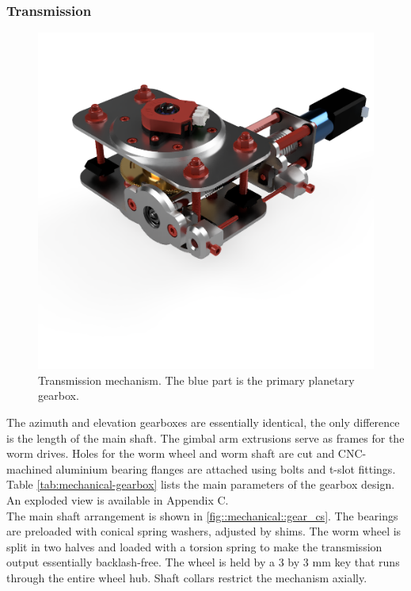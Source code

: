 \subsubsection{Transmission}
\begin{figure}[H]
	\centering 
	\includegraphics[scale=0.4]{4-experiment-design/img/mechanical/transmission.png}
	\caption{Transmission mechanism. The blue part is the primary planetary gearbox.}
	\label{fig::mechanical::transmission}
\end{figure}

The azimuth and elevation gearboxes are essentially identical, the only difference is the length of the main shaft. The gimbal arm extrusions serve as frames for the worm drives. Holes for the worm wheel and worm shaft are cut and CNC-machined aluminium bearing flanges are attached using bolts and t-slot fittings. Table \ref{tab:mechanical-gearbox} lists the main parameters of the gearbox design. An exploded view is available in Appendix C. \\


The main shaft arrangement is shown in \ref{fig::mechanical::gear_cs}. The bearings are preloaded with conical spring washers, adjusted by shims. The worm wheel is split in two halves and loaded with a torsion spring to make the transmission output essentially backlash-free. The wheel is held by a 3 by 3 mm key that runs through the entire wheel hub. Shaft collars restrict the mechanism axially.

